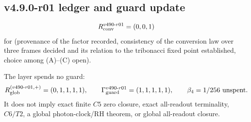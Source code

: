 \subsection*{v4.9.0-r01 ledger and guard update}
\label{subsec:v490-r01-ledger-guard}

\[
R_{\rm conv}^{v490\text{-}r01}=(0,0,1)
\]
for (provenance of the factor recorded, consistency of the conversion law over three frames decided and its relation to
the tribonacci fixed point established, choice among (A)--(C) open).

The layer spends no guard:
\[
R_{\rm glob}^{(v490\text{-}r01,+)}=(0,1,1,1,1),
\qquad
\Gamma_{\rm guard}^{v490\text{-}r01}=(1,1,1,1,1),
\qquad
\beta_4=1/256\ \text{unspent}.
\]
It does not imply exact finite \(C5\) zero closure, exact all-readout terminality,
\(C6/T2\), a global photon-clock/RH theorem, or global all-readout closure.

